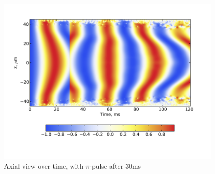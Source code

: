 \documentclass[12pt,notitlepage]{report}
\begin{document}
\begin{figure}
\includegraphics[width=5in]{axial_pi_pulse.pdf}
\caption{Axial view over time, with $\pi$-pulse after 30ms}
\label{axial_pi_pulse}
\end{figure}



\end{document}
